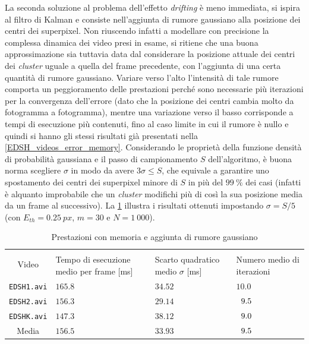\documentclass[12pt,a4paper,oneside]{article}
\begin{document}
\noindent La seconda soluzione al problema dell'effetto \textit{drifting} è meno immediata, si ispira al filtro di Kalman e consiste nell'aggiunta di rumore gaussiano alla posizione dei centri dei superpixel. Non riuscendo infatti a modellare con precisione la complessa dinamica dei video presi in esame, si ritiene che una buona approssimazione sia tuttavia data dal considerare la posizione attuale dei centri dei \textit{cluster} uguale a quella del frame precedente, con l'aggiunta di una certa quantità di rumore gaussiano. Variare verso l'alto l'intensità di tale rumore comporta un peggioramento delle prestazioni perché sono necessarie più iterazioni per la convergenza dell'errore (dato che la posizione dei centri cambia molto da fotogramma a fotogramma), mentre una variazione verso il basso corrisponde a tempi di esecuzione più contenuti, fino al caso limite in cui il rumore è nullo e quindi si hanno gli stessi risultati già presentati nella \cref{EDSH_videos_error_memory}. Considerando le proprietà della funzione densità di probabilità gaussiana e il passo di campionamento $S$ dell'algoritmo, è buona norma scegliere $\sigma$ in modo da avere $3\sigma \leq S$, che equivale a garantire uno spostamento dei centri dei superpixel minore di $S$ in più del $99~\%$ dei casi (infatti è alquanto improbabile che un \textit{cluster} modifichi più di così la sua posizione media da un frame al successivo). La \cref{EDSH_videos_noise} illustra i risultati ottenuti impostando $\sigma = S/5$ (con $E_{th} = 0.25~px$, $m = 30$ e $N = 1~000$).
\begin{table}[!htb]
	\renewcommand{\arraystretch}{1.3}
	\centering
	\begin{tabular}{|c||>{\centering\arraybackslash}m{}|>{\centering\arraybackslash}m{}|>{\centering\arraybackslash}m{}|}
	    \hline
		\multirow{2}{*}{\vspace{-6ex}Video}
		& \multicolumn{3}{c|}{VideoSLIC}\\\cline{2-4}
		& Tempo di esecuzione medio per frame [ms] & Scarto quadratico medio $\sigma$ [ms] & Numero medio di iterazioni\\
		\hline\hline
		\texttt{EDSH1.avi} & $165.8$ & $34.52$ & $            10.0$ \\\hline
		\texttt{EDSH2.avi} & $156.3$ & $29.14$ & $\hspace{.5em}9.5$ \\\hline
		\texttt{EDSHK.avi} & $147.3$ & $38.12$ & $\hspace{.5em}9.0$ \\\hline\hline
		Media              & $156.5$ & $33.93$ & $\hspace{.5em}9.5$ \\\hline
	\end{tabular}
	\caption{Prestazioni con memoria e aggiunta di rumore gaussiano}
	\label{EDSH_videos_noise}
\end{table}
\end{document}
